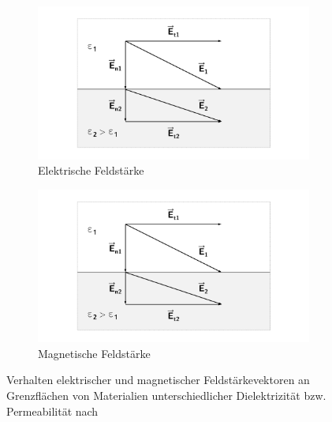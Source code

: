 \begin{figure}[ht]
    \centering
    \begin{subfigure}[b]{0.4\textwidth}
        \includegraphics[page = 1, width=\textwidth, trim = 4.8cm 1cm 4.8cm 1cm, clip]{Abbildungen/Kapitel2/Feldvektoren_an_Grenzflaechen.pdf}
        \caption{Elektrische Feldstärke}\label{subfig:2_Elektrische_Feldstaerke_an_Grenzflaeche}
    \end{subfigure}
    \hspace{2cm}
    \begin{subfigure}[b]{0.4\textwidth}
        \includegraphics[page = 2, width=\textwidth, trim = 4.8cm 1cm 4.8cm 1cm, clip]{Abbildungen/Kapitel2/Feldvektoren_an_Grenzflaechen.pdf}
        \caption{Magnetische Feldstärke}\label{subfig:2_Magnetische_Feldstaerke_an_Grenzflaeche}
    \end{subfigure}
    \caption[Verhalten elektrischer und magnetischer Feldstärkevektoren an Grenzflächen]{Verhalten elektrischer und magnetischer Feldstärkevektoren an Grenzflächen von \mbox{Materialien} unterschiedlicher Dielektrizität bzw. Permeabilität nach~\cite{EM_Schirmung}}
    \label{fig:2_Feldstaerken_an_Grenzflaechen}
\end{figure}

